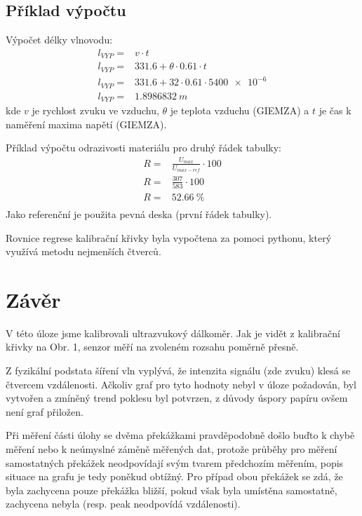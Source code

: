 \documentclass{protokol}
\begin{document}
    \subsection{Příklad výpočtu}
        Výpočet délky vlnovodu:
        \begin{align*}
            l_{VYP} =& v \cdot t  \\
            l_{VYP} =& \num{331.6}+\theta\cdot \num{0.61} \cdot t  \\
            l_{VYP} =& \num{331.6}+\num{32}\cdot \num{0.61} \cdot \num{5400e-6}  \\
            l_{VYP} =& \qty{1,8986832}{m} 
        \end{align*}
        kde \(v\) je rychlost zvuku ve vzduchu, \(\theta\) je teplota vzduchu (GIEMZA) a \(t\) je čas k naměření maxima napětí (GIEMZA).

        Příklad výpočtu odrazivosti materiálu pro druhý řádek tabulky:
        \begin{align*}
            R =& \frac{U_{max}}{U_{max-ref}}\cdot  100  \\
            R =& \frac{\num{307}}{583}\cdot  100  \\
            R =& \qty{52,66}{\percent}  \\
        \end{align*}
        Jako referenční je použita pevná deska (první řádek tabulky).

        Rovnice regrese kalibrační křivky byla vypočtena za pomoci pythonu, který využívá metodu nejmenších čtverců.

        
        
        \clearpage
        \section*{Závěr}
            V této úloze jsme kalibrovali ultrazvukový dálkoměr. Jak je vidět z kalibrační křivky na Obr. 1, senzor měří na zvoleném rozsahu poměrně přesně.
            
            Z fyzikální podstata šíření vln vyplývá, že intenzita signálu (zde zvuku) klesá se čtvercem vzdálenosti. Ačkoliv graf pro tyto hodnoty nebyl v úloze požadován, byl vytvořen a zmíněný trend poklesu byl potvrzen, z důvody úspory papíru ovšem není graf přiložen.
            
            Při měření části úlohy se dvěma překážkami pravděpodobně došlo buďto k chybě měření nebo k neúmyslné záměně měřených dat, protože průběhy pro měření samostatných překážek neodpovídají svým tvarem předchozím měřením, popis situace na grafu je tedy poněkud obtížný. Pro případ obou překážek se zdá, že byla zachycena pouze překážka bližší, pokud však byla umístěna samostatně, zachycena nebyla (resp. peak neodpovídá vzdálenosti).
\end{document}
